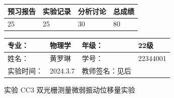 \documentclass[dvipsnames, svgnames,a4paper,11pt]{article}
\begin{document}
	
	
	
	
	\begin{table}
		\renewcommand\arraystretch{1.7}
		\begin{tabularx}{\textwidth}{
				|X|X|X|X
				|X|X|X|X|}
			\hline
			\multicolumn{2}{|c|}{预习报告}&\multicolumn{2}{|c|}{实验记录}&\multicolumn{2}{|c|}{分析讨论}&\multicolumn{2}{|c|}{总成绩}\\
			\hline
			\LARGE25 & & \LARGE25 & & \LARGE30 & & \LARGE80 & \\
			\hline
		\end{tabularx}
	\end{table}
	
	
	\begin{table}
		\renewcommand\arraystretch{1.7}
		\begin{tabularx}{\textwidth}{|X|X|X|X|}
			\hline
			专业： &  物理学 &年级： & 22级\\
			\hline
			姓名： & 黄罗琳 & 学号： & 22344001\\
			\hline
			实验时间： & 2024.3.7 & 教师签名：见后 & \\
			\hline
		\end{tabularx}
	\end{table}
	
	\begin{center}
		\LARGE 实验 CC3 \quad 双光栅测量微弱振动位移量实验
	\end{center}
	
	
\end{document}
